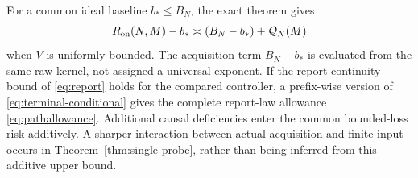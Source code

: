 For a common ideal baseline $b_*\le B_N$, the exact theorem gives
\[
 R_{\mathrm{on}}(N,M)-b_*\asymp (B_N-b_*)+\mathcal Q_N(M)
\]
when $V$ is uniformly bounded. The acquisition term $B_N-b_*$ is evaluated from the same raw kernel, not assigned a universal exponent. If the report continuity bound of \eqref{eq:report} holds for the compared controller, a prefix-wise version of \eqref{eq:terminal-conditional} gives the complete report-law allowance \eqref{eq:pathallowance}. Additional causal deficiencies enter the common bounded-loss risk additively. A sharper interaction between actual acquisition and finite input occurs in Theorem~\ref{thm:single-probe}, rather than being inferred from this additive upper bound.
